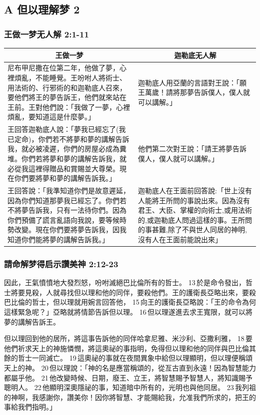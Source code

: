 \subsection{A 但以理解梦 2 }
\subsubsection{王做一梦无人解 2:1-11}
\begin{table}[H]
\centering
\begin{tabular}{p{8.75cm}|p{8.25cm}}\hline\hline
\multicolumn{1}{c|}{王做一梦}&\multicolumn{1}{c}{迦勒底无人解}\\\hline
尼布甲尼撒在位第二年，他做了夢，心裡煩亂，不能睡覺。王吩咐人將術士、用法術的、行邪術的和迦勒底人召來，要他們將王的夢告訴王，他們就來站在王前。王對他們說：「我做了一夢，心裡煩亂，要知道這是什麼夢。」&迦勒底人用亞蘭的言語對王說：「願王萬歲！請將那夢告訴僕人，僕人就可以講解。」\\\hline
王回答迦勒底人說：「夢我已經忘了(我已定命)，你們若不將夢和夢的講解告訴我，就必被凌遲，你們的房屋必成為糞堆。你們若將夢和夢的講解告訴我，就必從我這裡得贈品和賞賜並大尊榮。現在你們要將夢和夢的講解告訴我。」&他們第二次對王說：「請王將夢告訴僕人，僕人就可以講解。」\\\hline
王回答說：「我準知道你們是故意遲延，因為你們知道那夢我已經忘了。你們若不將夢告訴我，只有一法待你們。因為你們預備了謊言亂語向我說，要等候時勢改變。現在你們要將夢告訴我，因我知道你們能將夢的講解告訴我。」&迦勒底人在王面前回答說:「世上沒有人能將王所問的事說出來。因為沒有君王、大臣、掌權的向術士,或用法術的,或迦勒底人問過這樣的事。王所問的事甚難,除了不與世人同居的神明,沒有人在王面前能說出來」\\\hline
\end{tabular}
\end{table}


\subsubsection{請命解梦得启示讚美神 2:12-23}
因此，王氣憤憤地大發烈怒，吩咐滅絕巴比倫所有的哲士。 13 於是命令發出，哲士將要見殺，人就尋找但以理和他的同伴，要殺他們。王的護衛長亞略出來，要殺巴比倫的哲士，但以理就用婉言回答他， 15 向王的護衛長亞略說：「王的命令為何這樣緊急呢？」亞略就將情節告訴但以理。 16 但以理遂進去求王寬限，就可以將夢的講解告訴王。

但以理回到他的居所，將這事告訴他的同伴哈拿尼雅、米沙利、亞撒利雅， 18 要他們祈求天上的神施憐憫，將這奧祕的事指明，免得但以理和他的同伴與巴比倫其餘的哲士一同滅亡。 19 這奧祕的事就在夜間異象中給但以理顯明，但以理便稱頌天上的神。 20 但以理說：「神的名是應當稱頌的，從亙古直到永遠！因為智慧能力都屬乎他。 21 他改變時候、日期，廢王、立王，將智慧賜予智慧人，將知識賜予聰明人。 22 他顯明深奧隱祕的事，知道暗中所有的，光明也與他同居。 23 我列祖的神啊，我感謝你，讚美你！因你將智慧、才能賜給我，允准我們所求的，把王的事給我們指明。」


